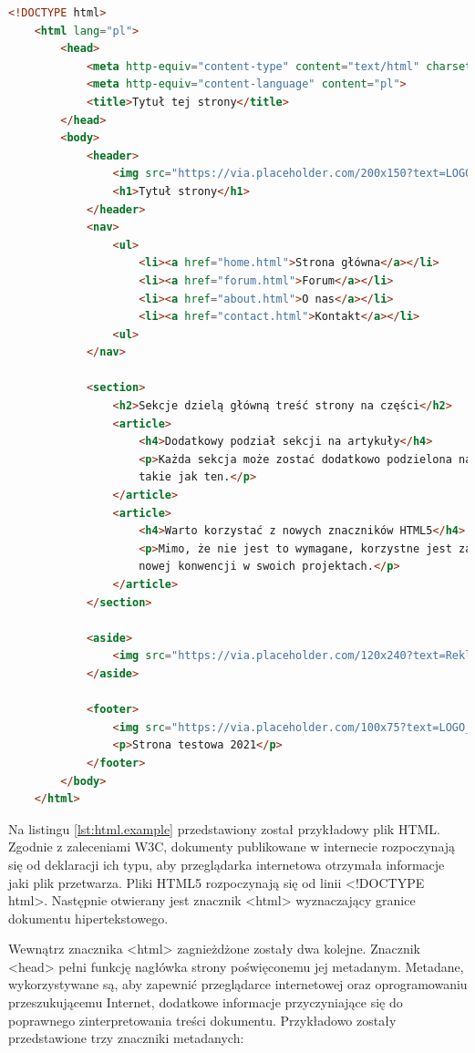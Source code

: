 \begin{lstlisting}[language=HTML, caption=Przykładowy dokument HTML5, label=lst:html.example]
    <!DOCTYPE html>
    <html lang="pl">
    	<head>
            <meta http-equiv="content-type" content="text/html" charset="utf-8">
            <meta http-equiv="content-language" content="pl">
            <title>Tytuł tej strony</title>
    	</head>
    	<body>
            <header>
                <img src="https://via.placeholder.com/200x150?text=LOGO_STRONY">
                <h1>Tytuł strony</h1>
            </header>
            <nav>
                <ul>
                    <li><a href="home.html">Strona główna</a></li>
                    <li><a href="forum.html">Forum</a></li>
                    <li><a href="about.html">O nas</a></li>
                    <li><a href="contact.html">Kontakt</a></li>
                <ul>
            </nav>
            
            <section>
                <h2>Sekcje dzielą główną treść strony na części</h2>
                <article>
                    <h4>Dodatkowy podział sekcji na artykuły</h4>
                    <p>Każda sekcja może zostać dodatkowo podzielona na artykuły
                    takie jak ten.</p>
                </article>
                <article>
                    <h4>Warto korzystać z nowych znaczników HTML5</h4>
                    <p>Mimo, że nie jest to wymagane, korzystne jest zastosowanie 
                    nowej konwencji w swoich projektach.</p>
                </article>
            </section>
            
            <aside>
                <img src="https://via.placeholder.com/120x240?text=Reklama">
            </aside>
            
            <footer>
                <img src="https://via.placeholder.com/100x75?text=LOGO_W_STOPCE">
                <p>Strona testowa 2021</p>
            </footer>
        </body>
    </html>
\end{lstlisting}

Na listingu \ref{lst:html.example} przedstawiony został przykładowy plik HTML. Zgodnie z zaleceniami W3C, dokumenty publikowane w internecie rozpoczynają się od deklaracji ich typu, aby przeglądarka internetowa otrzymała informacje jaki plik przetwarza. Pliki HTML5 rozpoczynają się od linii <!DOCTYPE html>. Następnie otwierany jest znacznik <html> wyznaczający granice dokumentu hipertekstowego.

Wewnątrz znacznika <html> zagnieżdżone zostały dwa kolejne. Znacznik <head> pełni funkcję nagłówka strony poświęconemu jej metadanym. Metadane, wykorzystywane są, aby zapewnić przeglądarce internetowej oraz oprogramowaniu przeszukującemu Internet, dodatkowe informacje przyczyniające się do poprawnego zinterpretowania treści dokumentu. Przykładowo zostały przedstawione trzy znaczniki metadanych:

